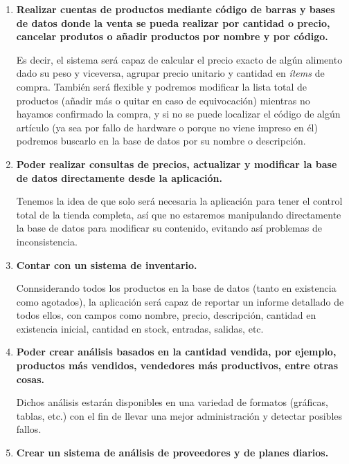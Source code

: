 \documentclass[12pt, fleqn]{report}                             %
\theoremstyle{break}                                            %
\begin{document}
        \begin{enumerate}
            \item \textbf{Realizar cuentas de productos mediante código de barras y bases de datos donde la venta se pueda realizar por cantidad o precio, cancelar produtos o añadir productos por nombre y por código.}
            
            Es decir, el sistema será capaz de calcular el precio exacto de algún alimento dado su peso y viceversa, agrupar precio unitario y cantidad en \emph{ítems} de compra. También será flexible y podremos modificar la lista total de productos (añadir más o quitar en caso de equivocación) mientras no hayamos confirmado la compra, y si no se puede localizar el código de algún artículo (ya sea por fallo de hardware o porque no viene impreso en él) podremos buscarlo en la base de datos por su nombre o descripción.
            
            
            \item \textbf{Poder realizar consultas de precios, actualizar y modificar la base de datos directamente desde la aplicación.}
            
            Tenemos la idea de que solo será necesaria la aplicación para tener el control total de la tienda completa, así que no estaremos manipulando directamente la base de datos para modificar su contenido, evitando así problemas de inconsistencia.
            
            \item \textbf{Contar con un sistema de inventario.}
            
            Connsiderando todos los productos en la base de datos (tanto en existencia como agotados), la aplicación será capaz de reportar un informe detallado de todos ellos, con campos como nombre, precio, descripción, cantidad en existencia inicial, cantidad en stock, entradas, salidas, etc.
            
            
            \item \textbf{Poder crear análisis basados en la cantidad vendida, por ejemplo, productos más vendidos, vendedores más productivos, entre otras cosas.}
            
            Dichos análisis estarán disponibles en una variedad de formatos (gráficas, tablas, etc.) con el fin de llevar una mejor administración y detectar posibles fallos.
            
            
            \item \textbf{Crear un sistema de análisis de proveedores y de planes diarios.}
            

\end{enumerate}
\end{document}
